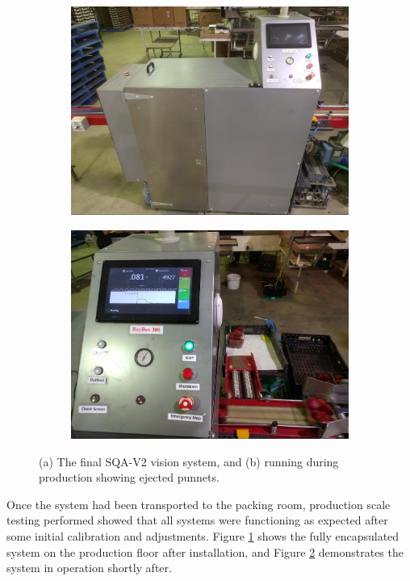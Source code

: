 \documentclass[fleqn,twoside,12pt]{report}
\begin{document}
\begin{figure}[h]
	\centering
	\begin{subfigure}{0.5\textwidth}
		\centering
		\includegraphics[width=0.95\linewidth]{SQA2_complete.jpg}
		\caption{}
		\label{fig:SQA2_complete}
	\end{subfigure}%
	\begin{subfigure}{0.5\textwidth}
		\centering
		\includegraphics[width=0.95\linewidth]{action_shot.jpg}
		\caption{}
		\label{fig:action_shot}
	\end{subfigure}%
	\caption{(a) The final SQA-V2 vision system, and (b) running during production showing ejected punnets.}
	\label{}
\end{figure}

Once the system had been transported to the packing room, production scale testing performed showed that all systems were functioning as expected after some initial calibration and adjustments. Figure \ref{fig:SQA2_complete} shows the fully encapsulated system on the production floor after installation, and Figure \ref{fig:action_shot} demonstrates the system in operation shortly after.
\end{document}
